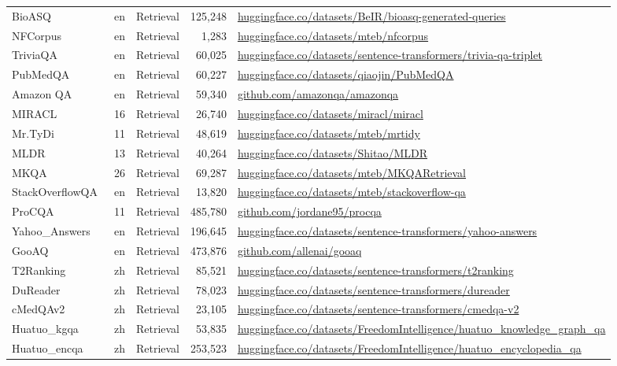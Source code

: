 \begin{table}[th]
{\begin{tabular}{lccrm{9cm}}
BioASQ~\citep{2015BioASQ} & en & Retrieval & 125,248 & \url{huggingface.co/datasets/BeIR/bioasq-generated-queries} \\
NFCorpus~\citep{2016NFCorpus} & en & Retrieval & 1,283 & \url{huggingface.co/datasets/mteb/nfcorpus} \\
TriviaQA~\citep{2017TriviaQA} & en & Retrieval & 60,025 & \url{huggingface.co/datasets/sentence-transformers/trivia-qa-triplet} \\
PubMedQA~\citep{2019PubMedQA} & en & Retrieval & 60,227 & \url{huggingface.co/datasets/qiaojin/PubMedQA} \\
Amazon QA~\citep{2019AmazonQA} & en & Retrieval & 59,340 & \url{github.com/amazonqa/amazonqa} \\
MIRACL~\citep{2023MIRACL} & 16 & Retrieval & 26,740 & \url{huggingface.co/datasets/miracl/miracl} \\
Mr.TyDi~\citep{2021mrtidy} & 11 & Retrieval & 48,619 & \url{huggingface.co/datasets/mteb/mrtidy} \\
MLDR~\citep{2024BGE-M3} & 13 & Retrieval & 40,264 & \url{huggingface.co/datasets/Shitao/MLDR} \\
MKQA~\citep{2021mkqa} & 26 & Retrieval & 69,287 & \url{huggingface.co/datasets/mteb/MKQARetrieval} \\
StackOverflowQA~\citep{2025CoIR} & en & Retrieval & 13,820 & \url{huggingface.co/datasets/mteb/stackoverflow-qa} \\
ProCQA~\citep{2025procqa} & 11 & Retrieval & 485,780 & \url{github.com/jordane95/procqa} \\
Yahoo\_Answers~\citep{2015yahooanswers} & en & Retrieval & 196,645 & \url{huggingface.co/datasets/sentence-transformers/yahoo-answers} \\
GooAQ~\citep{2021gooaq} & en & Retrieval & 473,876 & \url{github.com/allenai/gooaq} \\
T2Ranking~\citep{2023t2ranking} & zh & Retrieval & 85,521 & \url{huggingface.co/datasets/sentence-transformers/t2ranking} \\
DuReader~\citep{2018dureader} & zh & Retrieval & 78,023 & \url{huggingface.co/datasets/sentence-transformers/dureader} \\
cMedQAv2~\citep{2018cmedqav2} & zh & Retrieval & 23,105 & \url{huggingface.co/datasets/sentence-transformers/cmedqa-v2} \\
Huatuo\_kgqa~\citep{2025huatuoqa} & zh & Retrieval & 53,835 & \url{huggingface.co/datasets/FreedomIntelligence/huatuo_knowledge_graph_qa} \\
Huatuo\_encqa~\citep{2025huatuoqa} & zh & Retrieval & 253,523 & \url{huggingface.co/datasets/FreedomIntelligence/huatuo_encyclopedia_qa} \\

\end{tabular}}
\end{table}
